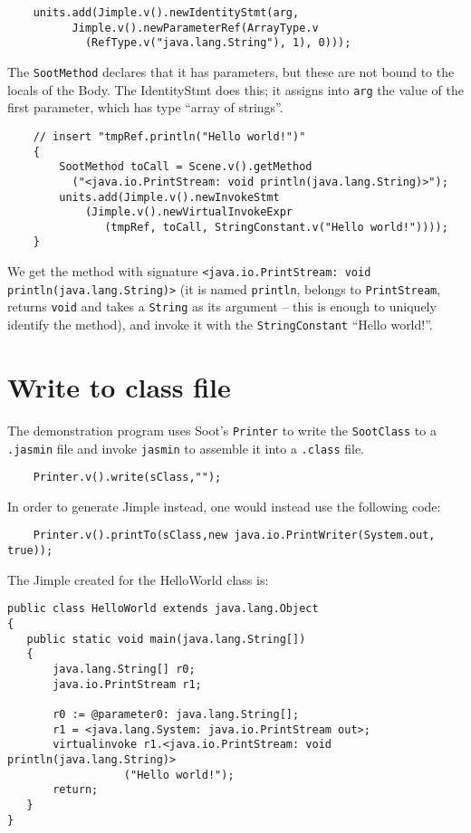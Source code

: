 \documentclass{article}
\begin{document}
\begin{verbatim}
    units.add(Jimple.v().newIdentityStmt(arg, 
          Jimple.v().newParameterRef(ArrayType.v
            (RefType.v("java.lang.String"), 1), 0)));
\end{verbatim}

The {\tt SootMethod} declares that it has parameters, but these are not
bound to the locals of the Body.  The IdentityStmt does this; it assigns
into {\tt arg} the value of the first parameter, which has type ``array of
strings''.

\begin{verbatim}
    // insert "tmpRef.println("Hello world!")"
    {
        SootMethod toCall = Scene.v().getMethod
          ("<java.io.PrintStream: void println(java.lang.String)>");
        units.add(Jimple.v().newInvokeStmt
            (Jimple.v().newVirtualInvokeExpr
               (tmpRef, toCall, StringConstant.v("Hello world!"))));
    }
\end{verbatim}                      

We get the method with signature 
{\tt <java.io.PrintStream: void println(java.lang.String)>}
(it is named {\tt println}, belongs to {\tt PrintStream}, returns 
{\tt void} and
takes a {\tt String} as its argument -- this is enough to uniquely
identify the method), and invoke it with the {\tt StringConstant} 
``Hello world!''.

\section{Write to class file}

The demonstration program uses Soot's {\tt Printer} to write the {\tt SootClass} to a {\tt .jasmin}
file and invoke {\tt jasmin} to assemble it into a {\tt .class} file.

\noindent
\begin{verbatim}    Printer.v().write(sClass,""); \end{verbatim}

In order to generate Jimple instead, one would instead use the following code:
\noindent
\begin{verbatim}    Printer.v().printTo(sClass,new java.io.PrintWriter(System.out, true)); \end{verbatim}

The Jimple created for the HelloWorld class is:

\begin{verbatim}
public class HelloWorld extends java.lang.Object
{
   public static void main(java.lang.String[])
   {
       java.lang.String[] r0;
       java.io.PrintStream r1;

       r0 := @parameter0: java.lang.String[];
       r1 = <java.lang.System: java.io.PrintStream out>;
       virtualinvoke r1.<java.io.PrintStream: void println(java.lang.String)>
                  ("Hello world!");
       return;
   }
}
\end{verbatim}
\end{document}
